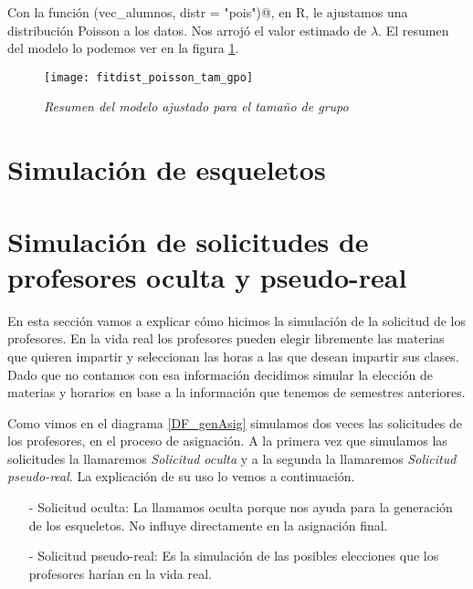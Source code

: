 Con la función \verb@fitdist(vec_alumnos, distr = "pois")@, en R, le ajustamos una distribución Poisson a los datos. Nos arrojó el valor estimado de $\lambda$. El resumen del modelo lo podemos ver en la figura \ref{fitdistPois_tamGpo}.

\begin{figure}[H]
\centering
\texttt{[image: fitdist\_poisson\_tam\_gpo]} %
\caption{\textit{Resumen del modelo ajustado para el tamaño de grupo}}\label{fitdistPois_tamGpo}
\end{figure}







\section{Simulación de esqueletos}



\section{Simulación de solicitudes de profesores oculta y pseudo-real}

En esta sección vamos a explicar cómo hicimos la simulación de la solicitud de los profesores. En la vida real los profesores pueden elegir libremente las materias que quieren impartir y seleccionan las horas a las que desean impartir sus clases. Dado que no contamos con esa información decidimos simular la elección de materias y horarios en base a la información que tenemos de semestres anteriores.

Como vimos en el diagrama \ref{DF_genAsig} simulamos dos veces las solicitudes de los profesores, en el proceso de asignación. A la primera vez que simulamos las solicitudes la llamaremos \textit{Solicitud oculta} y a la segunda la llamaremos \textit{Solicitud pseudo-real}. La explicación de su uso lo vemos a continuación.

\begin{itemize}
\item[-] Solicitud oculta: La llamamos oculta porque nos ayuda para la generación de los esqueletos. No influye directamente en la asignación final.

\item[-] Solicitud pseudo-real: Es la simulación de las posibles elecciones que los profesores harían en la vida real.
\end{itemize}

